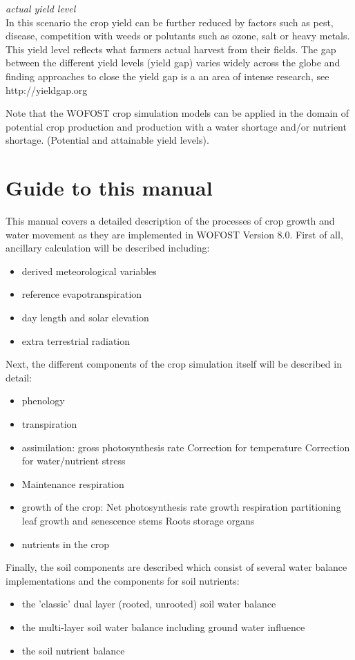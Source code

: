 {\it actual yield level\/}\\
In this scenario the crop yield can be further reduced by factors such as pest, disease, competition with weeds
or polutants such as ozone, salt or heavy metals. This yield level reflects what farmers actual
harvest from their fields. The gap between the different yield levels (yield gap) varies widely
across the globe and finding approaches to close the yield gap is a an area of intense research,
see http://yieldgap.org

Note that the WOFOST crop simulation models can be applied in the domain of potential crop
production and production with a water shortage and/or nutrient shortage.
(Potential and attainable yield levels). 


\section{Guide to this manual}

This manual covers a detailed description of the processes of crop growth and water movement as they are
implemented in WOFOST Version 8.0. First of all, ancillary calculation will be described including:
\begin{itemize}
	\item derived meteorological variables
	\item reference evapotranspiration
	\item day length and solar elevation
	\item extra terrestrial radiation
\end{itemize}

Next, the different components of the crop simulation itself will be described in detail:
\begin{itemize}
	\item phenology
	\item transpiration
	\item assimilation:
	\subitem gross photosynthesis rate
	\subitem Correction for temperature
	\subitem Correction for water/nutrient stress
	\item Maintenance respiration
	\item growth of the crop:
	\subitem Net photosynthesis rate
	\subitem growth respiration
	\subitem partitioning
	\subitem leaf growth and senescence 
	\subitem stems
	\subitem Roots
	\subitem storage organs	
	\item nutrients in the crop
\end{itemize}

Finally, the soil components are described which consist of several water balance implementations and the components for soil nutrients:
\begin{itemize}
	\item the 'classic' dual layer (rooted, unrooted) soil water balance 
	\item the multi-layer soil water balance including ground water influence
	\item the soil nutrient balance
\end{itemize}
